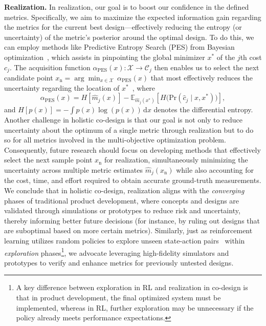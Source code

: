 \textbf{Realization.}
In realization, our goal is to boost our confidence in the defined metrics. Specifically, we aim to maximize the expected information gain regarding the metrics for the current best design—effectively reducing the entropy (or uncertainty) of the metric’s posterior around the optimal design. To do this, we can employ methods like Predictive Entropy Search (PES) from Bayesian optimization~\citep{hernandez2014predictive}, which assists in pinpointing the global minimizer $x^*$ of the $j$th cost $c_j$. The acquisition function $\alpha_\mathrm{PES}(x): \mathcal{X} \to \mathcal{C}_j$ then enables us to select the next candidate point
$x_\mathrm{n} = \arg \min_{x \in \mathcal{X}} \, \alpha_\mathrm{PES}(x)$
that most effectively reduces the uncertainty regarding the location of $x^*$~\citep{hernandez2014predictive}, where
\begin{equation}
    \alpha_\mathrm{PES}(x) = H[\hat{m}_j(x)] - \mathbb{E}_{\hat{m}_j(x^*)} \left[ H\big(\mathrm{Pr}(\hat{c}_j \mid x,x^*)\big) \right],
\end{equation}
and $H[p(x)] = -\int p(x) \log(p(x)) \, \mathrm{d}x$ denotes the differential entropy. 
Another challenge in holistic co-design is that our goal is not only to reduce uncertainty about the optimum of a single metric through realization but to do so for all metrics involved in the multi-objective optimization problem. Consequently, future research should focus on developing methods that effectively select the next sample point $x_\mathrm{n}$ for realization, simultaneously minimizing the uncertainty across multiple metric estimates $\hat{m}_j(x_\mathrm{n})$ while also accounting for the cost, time, and effort required to obtain accurate ground-truth measurements.
We conclude that in holistic co-design, realization aligns with the \emph{converging} phases of traditional product development, where concepts and designs are validated through simulations or prototypes to reduce risk and uncertainty, thereby informing better future decisions (for instance, by ruling out designs that are suboptimal based on more certain metrics). Similarly, just as reinforcement learning utilizes random policies to explore unseen state-action pairs~\citep{sutton1998reinforcement} within \emph{exploration} phases\footnote{A key difference between exploration in \gls{RL} and realization in co-design is that in product development, the final optimized system must be implemented, whereas in \gls{RL}, further exploration may be unnecessary if the policy already meets performance expectations.}, we advocate leveraging high-fidelity simulators and prototypes to verify and enhance metrics for previously untested designs.

